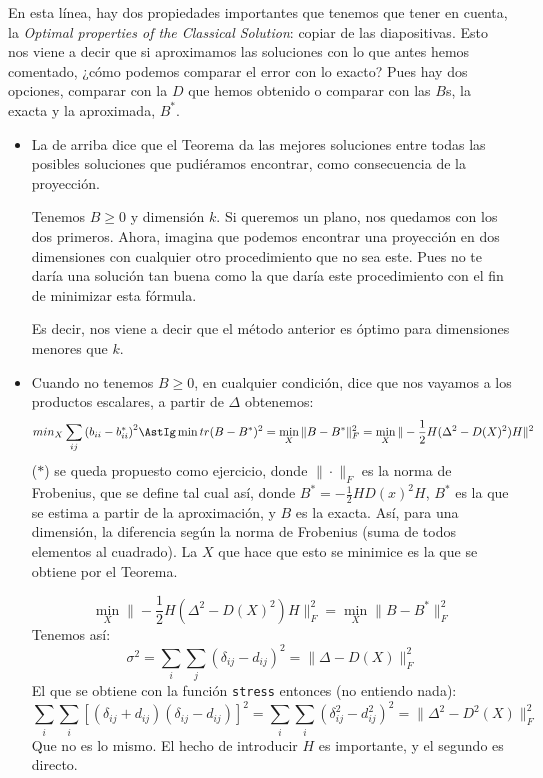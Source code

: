 En esta línea, hay dos propiedades importantes que tenemos que tener en cuenta, la \textit{Optimal properties of the Classical Solution}: copiar de las diapositivas. Esto nos viene a decir que si aproximamos las soluciones con lo que antes hemos comentado, ¿cómo podemos comparar el error con lo exacto? Pues hay dos opciones, comparar con la $D$ que hemos obtenido o comparar con las $B$s, la exacta y la aproximada, $B^\ast$.
\begin{itemize}
    \item La de arriba dice que el Teorema da las mejores soluciones entre todas las posibles soluciones que pudiéramos encontrar, como consecuencia de la proyección. %

        Tenemos $B\geq 0$ y dimensión $k$. Si queremos un plano, nos quedamos con los dos primeros. Ahora, imagina que podemos encontrar una proyección en dos dimensiones con cualquier otro procedimiento que no sea este. Pues no te daría una solución tan buena como la que daría este procedimiento con el fin de minimizar esta fórmula.

        Es decir, nos viene a decir que el método anterior es óptimo para dimensiones menores que $k$.
    \item Cuando no tenemos $B\geq 0$, en cualquier condición, dice que nos vayamos a los productos escalares, a partir de $\Delta$ obtenemos:
        \begin{equation*}
            min_X \sum_{ij} {(b_{ii} - b_{ii}^\ast)}^{2} \AstIg \min tr(B-B^\ast)^2 = \min_X \|B-B^\ast\|_F^2 = \min_X \| -\frac{1}{2} H(\Delta^2-D(X)^2)H\|^2
        \end{equation*}
        ($\ast$) se queda propuesto como ejercicio, donde $\|\cdot\|_F$ es la norma de Frobenius, que se define tal cual así, donde $B^\ast = -\frac{1}{2}HD(x)^2H$, $B^\ast$ es la que se estima a partir de la aproximación, y $B$ es la exacta. Así, para una dimensión, la diferencia según la norma de Frobenius (suma de todos elementos al cuadrado). La $X$  que hace que esto se minimice es la que se obtiene por el Teorema.

        \begin{equation*}
            \min_X\|-\frac{1}{2}H(\Delta^2 - D(X)^2)H\|^2_F = \min_X \|B-B^\ast\|_F^2
        \end{equation*}
        Tenemos así:
        \begin{equation*}
            \sigma^2 = \sum_{i} \sum_{j} {(\delta_{i j} - d_{i j})}^{2} = \|\Delta - D(X)\|_F^2
        \end{equation*}
        El que se obtiene con la función \texttt{stress} entonces (no entiendo nada):
        \begin{equation*}
            \sum_i\sum_i [(\delta_{i j}+ d_{i j})(\delta_{ij}-d_{ij})]^2 = \sum_i \sum_i {(\delta_{i j}^2 - d_{i j}^2)}^2 = \|\Delta^2 - D^2(X)\|_F^2
        \end{equation*}
        Que no es lo mismo. El hecho de introducir $H$ es importante, y el segundo es directo.
\end{itemize}

